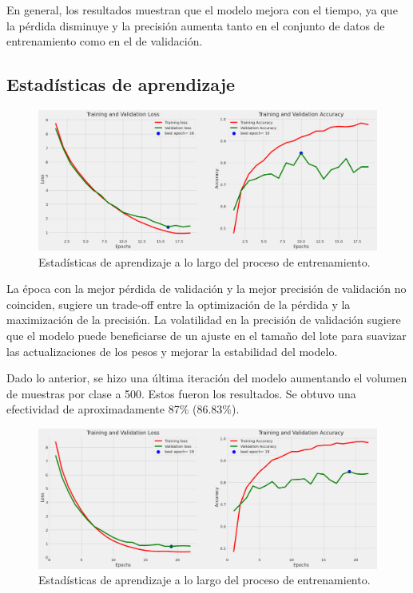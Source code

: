     En general, los resultados muestran que el modelo mejora con el tiempo, ya que la pérdida disminuye y la precisión aumenta tanto en el conjunto de datos de entrenamiento como en el de validación.

\subsection{Estadísticas de aprendizaje}\label{sub:learning_statistics_p2}
		\begin{figure}[ht]%
      \begin{center}
      \includegraphics[width=1\textwidth]{./Graphics/training&validation_p2.png}
      \caption{Estadísticas de aprendizaje a lo largo del proceso de entrenamiento.\label{fig:training_validation_loss_p2}}
      \end{center}
		\end{figure}
  
La época con la mejor pérdida de validación y la mejor precisión de validación no coinciden, sugiere un trade-off entre la optimización de la pérdida y la maximización de la precisión. La volatilidad en la precisión de validación sugiere que el modelo puede beneficiarse de un ajuste en el tamaño del lote para suavizar las actualizaciones de los pesos y mejorar la estabilidad del modelo.

Dado lo anterior, se hizo una última iteración del modelo aumentando el volumen de muestras por clase a 500. Estos fueron los resultados. Se obtuvo una efectividad de aproximadamente 87\% (86.83\%).

\begin{figure}[ht]%
   \begin{center}
   \includegraphics[width=1\textwidth]{./Graphics/training&validation_p3.png}
   \caption{Estadísticas de aprendizaje a lo largo del proceso de entrenamiento.\label{fig:training_validation_loss_p3}}
   \end{center}
   \end{figure}

